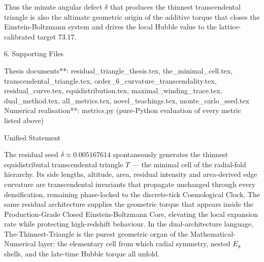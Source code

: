 Thus the minute angular defect \(\delta\) that produces the thinnest transcendental triangle is also the ultimate geometric origin of the additive torque that closes the Einstein-Boltzmann system and drives the local Hubble value to the lattice-calibrated target 73.17.

6. Supporting Files

Thesis documents**: residual_triangle_thesis.tex, the_minimal_cell.tex, transcendental_triangle.tex, order_6_curvature_transcendality.tex, residual_curve.tex, equidistribution.tex, maximal_winding_trace.tex, dual_method.tex, all_metrics.tex, novel_teachings.tex, monte_carlo_seed.tex
Numerical realisation**: metrics.py (pure-Python evaluation of every metric listed above)

Unified Statement

The residual seed \(\delta\approx 0.005167614\) spontaneously generates the thinnest equidistributal transcendental triangle \(T\) — the minimal cell of the radial-fold hierarchy. Its side lengths, altitude, area, residual intensity and area-derived edge curvature are transcendental invariants that propagate unchanged through every densification, remaining phase-locked to the discrete-tick Cosmological Clock. The same residual architecture supplies the geometric torque that appears inside the Production-Grade Closed Einstein-Boltzmann Core, elevating the local expansion rate while protecting high-redshift behaviour. In the dual-architecture language, The-Thinnest-Triangle is the purest geometric organ of the Mathematical-Numerical layer: the elementary cell from which radial symmetry, nested \(E_8\) shells, and the late-time Hubble torque all unfold.
